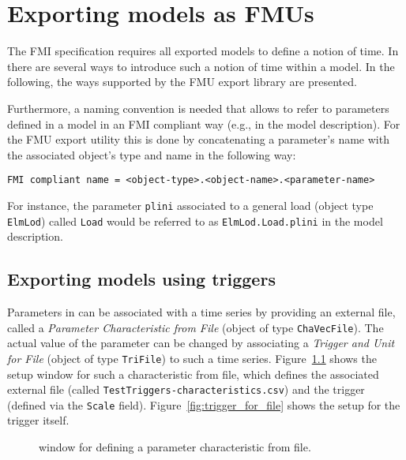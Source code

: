 
\chapter{Exporting \pf models as FMUs}

The FMI specification requires all exported models to define a notion of time.
In \pf there are several ways to introduce such a notion of time within a model.
In the following, the ways supported by the \fmipp \pf FMU export library are presented.


Furthermore, a naming convention is needed that allows to refer to parameters defined in a \pf model in an FMI compliant way (e.g., in the model description).
For the \fmipp \pf FMU export utility this is done by concatenating a parameter's name with the associated object's type and name in the following way:
\begin{verbatim}
FMI compliant name = <object-type>.<object-name>.<parameter-name>
\end{verbatim}
For instance, the parameter \texttt{plini} associated to a general load (object type \texttt{ElmLod}) called \texttt{Load} would be referred to as \texttt{ElmLod.Load.plini} in the model description.

\section{Exporting models using triggers}

Parameters in \pf can be associated with a time series by providing an external file, called a \emph{Parameter Characteristic from File} (\pf object of type \texttt{ChaVecFile}).
The actual value of the parameter can be changed by associating a \emph{Trigger and Unit for File} (\pf object of type \texttt{TriFile}) to such a time series.
Figure~\ref{fig:characteristics_from_file} shows the setup window for such a characteristic from file, which defines the associated external file (called \texttt{TestTriggers-characteristics.csv}) and the trigger (defined via the \texttt{Scale} field).
Figure~\ref{fig:trigger_for_file} shows the setup for the trigger itself.

\begin{figure}[h!]
\caption{\pf window for defining a parameter characteristic from file.}
\label{fig:characteristics_from_file}
\vspace{1em}
\end{figure}

